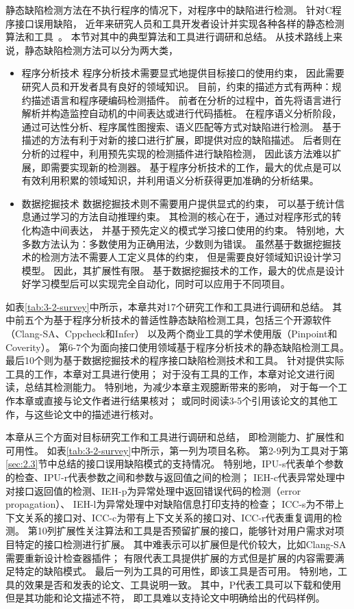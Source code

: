 静态缺陷检测方法在不执行程序的情况下，对程序中的缺陷进行检测。
针对C程序接口误用缺陷，
近年来研究人员和工具开发者设计并实现各种各样的静态检测算法和工具~\cite{16-saner-evaluation, survey18}。
本节对其中的典型算法和工具进行调研和总结。
从技术路线上来说，静态缺陷检测方法可以分为两大类，
\begin{itemize}
	\item {\kaishu 程序分析技术}
	程序分析技术需要显式地提供目标接口的使用约束，
	因此需要研究人员和开发者具有良好的领域知识。
	目前，约束的描述方式有两种：规约描述语言和程序硬编码检测插件。
	前者在分析的过程中，首先将语言进行解析并构造监控自动机的中间表达或进行代码插桩。
	在程序语义分析阶段，通过可达性分析、程序属性图搜索、语义匹配等方式对缺陷进行检测。
	基于描述的方法有利于对新的接口进行扩展，即提供对应的缺陷描述。
	后者则在分析的过程中，利用预先实现的检测插件进行缺陷检测，
	因此该方法难以扩展，即需要实现新的检测器。
	基于程序分析技术的工作，最大的优点是可以有效利用积累的领域知识，并利用语义分析获得更加准确的分析结果。
	\item {\kaishu 数据挖掘技术}
	数据挖掘技术则不需要用户提供显式的约束，
	可以基于统计信息通过学习的方法自动推理约束。
	其检测的核心在于，通过对程序形式的转化构造中间表达，
	并基于预先定义的模式学习接口使用的约束。
	特别地，大多数方法认为：多数使用为正确用法，少数则为错误。
	虽然基于数据挖掘技术的检测方法不需要人工定义具体的约束，
	但是需要良好领域知识设计学习模型。
	因此，其扩展性有限。
	基于数据挖掘技术的工作，最大的优点是设计好学习模型后可以实现完全自动化，同时可以应用于不同项目。
\end{itemize}

如表\ref{tab:3-2-survey}中所示，本章共对17个研究工作和工具进行调研和总结。
其中前五个为基于程序分析技术的普适性静态缺陷检测工具，包括三个开源软件（Clang-SA、Cppcheck和Infer）
以及两个商业工具的学术使用版（Pinpoint和Coverity）。
第6-7个为面向接口使用领域基于程序分析技术的静态缺陷检测工具。
最后10个则为基于数据挖掘技术的程序接口缺陷检测技术和工具。
针对提供实际工具的工作，本章对工具进行使用；
对于没有工具的工作，本章对论文进行阅读，总结其检测能力。
特别地，为减少本章主观臆断带来的影响，
对于每一个工作本章或直接与论文作者进行结果核对；
或同时阅读3-5个引用该论文的其他工作，与这些论文中的描述进行核对。



本章从三个方面对目标研究工作和工具进行调研和总结，
即检测能力、扩展性和可用性。
如表\ref{tab:3-2-survey}中所示，第一列为项目名称。
第2-9列为工具对于第\ref{sec:2.3}节中总结的接口误用缺陷模式的支持情况。
特别地，IPU-s代表单个参数的检查、IPU-r代表参数之间和参数与返回值之间的检测；
IEH-c代表异常处理中对接口返回值的检测、IEH-p为异常处理中返回错误代码的检测（error propagation）、
IEH-l为异常处理中对缺陷信息打印支持的检查；
ICC-s为不带上下文关系的接口对、ICC-c为带有上下文关系的接口对、ICC-r代表重复调用的检测。
第10列扩展性关注算法和工具是否预留扩展的接口，能够针对用户需求对项目特定的接口检测进行扩展。
其中难表示可以扩展但是代价较大，比如Clang-SA需要重新设计检查器插件；
有限代表工具提供扩展的方式但是扩展的内容需要满足特定的缺陷模式。
最后一列为工具的可用性，即该工具是否可用。
特别地，工具的效果是否和发表的论文、工具说明一致。
其中，P代表工具可以下载和使用但是其功能和论文描述不符，
即工具难以支持论文中明确给出的代码样例。

